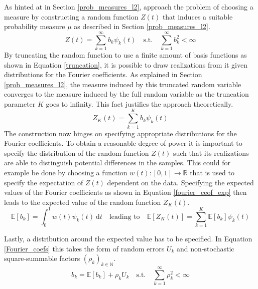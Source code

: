 \documentclass[12pt, a4paper]{article}
\theoremstyle{MAstyle} \newtheorem{assumption}{Assumption}[section]
\theoremstyle{MAstyle} \newtheorem{definition}{Definition}[section]
\theoremstyle{MAstyle} \newtheorem{theorem}{Theorem}[section]
\begin{document}
			As hinted at in Section \ref{prob_measures_l2}, \cite{bugni_permutation_2021} approach the problem of choosing a measure by constructing a random function $Z(t)$ that induces a suitable probability measure $\mu$ as described in Section \ref{prob_measures_l2}. 			
			\begin{equation}\label{non_truncated}
				Z(t) = \sum_{k = 1}^{\infty} b_k \psi_k(t)
				\quad \text{s.t.} \quad
				\sum_{k = 1}^{\infty} b_k^2 < \infty
			\end{equation}
			By truncating the random function to use a finite amount of basis functions as shown in Equation \ref{truncation}, it is possible to draw realizations from it given distributions for the  Fourier coefficients. As explained in Section \ref{prob_measures_l2}, the measure induced by this truncated random variable converges to the measure induced by the full random variable as the truncation parameter $K$ goes to infinity. This fact justifies the approach theoretically.
			\begin{equation}\label{truncation}
				Z_K(t) = \sum_{k = 1}^{K} b_k \psi_k(t)
			\end{equation}
			The construction now hinges on specifying appropriate distributions for the Fourier coefficients. To obtain a reasonable degree of power it is important to specify the distribution of the random function $Z(t)$ such that its realizations are able to distinguish potential differences in the samples. This could for example be done by choosing a function $w(t):[0,1] \rightarrow \mathbb{R}$ that is used to specify the expectation of $Z(t)$ dependent on the data. 
			Specifying the expected values of the Fourier coefficients as shown in Equation \ref{fourier_ceof_exp} then leads to the expected value of the random function $Z_K(t)$.
			\begin{equation}\label{fourier_ceof_exp}
				\mathbb{E}\left[b_k\right] = \int_{0}^{1}w(t)\psi_k(t) \ \mathrm{d}t
				\quad \text{leading to} \quad
				\mathbb{E}\left[Z_K(t)\right] = \sum_{k = 1}^{K} \mathbb{E}\left[b_k\right] \psi_k(t)
			\end{equation}
		
			Lastly, a distribution around the expected value has to be specified. In Equation \ref{Fourier_coefs} this takes the form of random errors $U_k$ and non-stochastic square-summable factors $(\rho_k)_{k \in \mathbb{N}}$.
			\begin{equation}\label{Fourier_coefs}
				b_k = \mathbb{E}\left[b_k\right] + \rho_k U_k
				\quad \text{s.t.} \quad
				\sum_{k = 1}^{\infty} \rho_k^2 < \infty 
			\end{equation}
\end{document}
